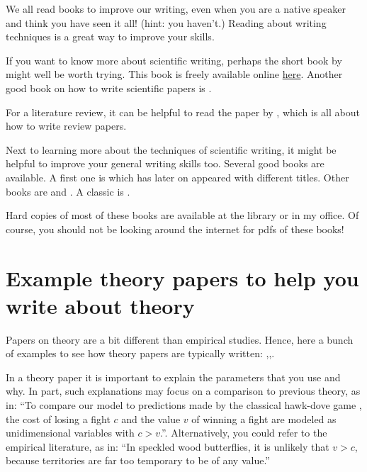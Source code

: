 \documentclass[
]{book}
\begin{document}
We all read books to improve our writing, even when you are a native speaker and think you have seen it all! (hint: you haven't.) Reading about writing techniques is a great way to improve your skills.

If you want to know more about scientific writing, perhaps the short book by \citet{Mack2018} might well be worth trying. This book is freely available online \href{https://spie.org/Publications/Book/2317706?SSO=1}{here}. Another good book on how to write scientific papers is \citet{Gastel2022}.

For a literature review, it can be helpful to read the paper by \citet{Sayer2018}, which is all about how to write review papers.

Next to learning more about the techniques of scientific writing, it might be helpful to improve your general writing skills too. Several good books are available. A first one is \citet{Williams1990} which has later on appeared
with different titles. Other books are \citet{Pinker2014} and \citet{Zinsser2006}. A classic is \citet{Strunk1959}.

Hard copies of most of these books are available at the library or in my office. Of course, you should not be looking around the internet for pdfs of these books!

\hypertarget{example-theory-papers-to-help-you-write-about-theory}{%
\section{Example theory papers to help you write about theory}\label{example-theory-papers-to-help-you-write-about-theory}}

Papers on theory are a bit different than empirical studies. Hence, here a bunch of examples to see how theory papers are typically written: \citep{Fawcett2007},\citep{Trimmer2015},\citep{Kahn2015}.

In a theory paper it is important to explain the parameters that you use and why. In part, such explanations may focus on a comparison to previous theory, as in: ``To compare our model to predictions made by the classical hawk-dove game \citep{MaynardSmith1973}, the cost of losing a fight \(c\) and the value \(v\) of winning a fight are modeled as unidimensional variables with \(c > v\).''. Alternatively, you could refer to the empirical literature, as in: ``In speckled wood butterflies, it is unlikely that \(v>c\), because territories are far too temporary to be of any value.''
\end{document}
